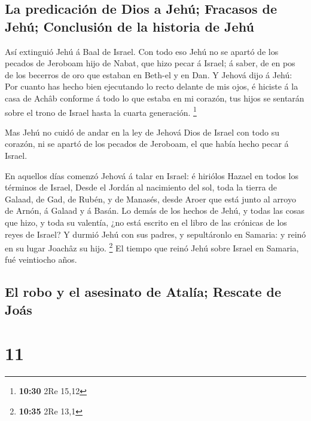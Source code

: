 \hypertarget{la-predicaciuxf3n-de-dios-a-jehuxfa-fracasos-de-jehuxfa-conclusiuxf3n-de-la-historia-de-jehuxfa}{%
\subsection{La predicación de Dios a Jehú; Fracasos de Jehú; Conclusión
de la historia de
Jehú}\label{la-predicaciuxf3n-de-dios-a-jehuxfa-fracasos-de-jehuxfa-conclusiuxf3n-de-la-historia-de-jehuxfa}}

 Así extinguió Jehú á Baal de Israel.  Con
todo eso Jehú no se apartó de los pecados de Jeroboam hijo de Nabat, que
hizo pecar á Israel; á saber, de en pos de los becerros de oro que
estaban en Beth-el y en Dan.  Y Jehová dijo á Jehú: Por
cuanto has hecho bien ejecutando lo recto delante de mis ojos, é hiciste
á la casa de Achâb conforme á todo lo que estaba en mi corazón, tus
hijos se sentarán sobre el trono de Israel hasta la cuarta generación.
\footnote{\textbf{10:30} 2Re 15,12}

 Mas Jehú no cuidó de andar en la ley de Jehová Dios de
Israel con todo su corazón, ni se apartó de los pecados de Jeroboam, el
que había hecho pecar á Israel.

 En aquellos días comenzó Jehová á talar en Israel: é
hiriólos Hazael en todos los términos de Israel,  Desde
el Jordán al nacimiento del sol, toda la tierra de Galaad, de Gad, de
Rubén, y de Manasés, desde Aroer que está junto al arroyo de Arnón, á
Galaad y á Basán.  Lo demás de los hechos de Jehú, y
todas las cosas que hizo, y toda su valentía, ¿no está escrito en el
libro de las crónicas de los reyes de Israel?  Y durmió
Jehú con sus padres, y sepultáronlo en Samaria: y reinó en su lugar
Joachâz su hijo. \footnote{\textbf{10:35} 2Re 13,1}  El
tiempo que reinó Jehú sobre Israel en Samaria, fué veintiocho años.

\hypertarget{el-robo-y-el-asesinato-de-ataluxeda-rescate-de-jouxe1s}{%
\subsection{El robo y el asesinato de Atalía; Rescate de
Joás}\label{el-robo-y-el-asesinato-de-ataluxeda-rescate-de-jouxe1s}}

\hypertarget{section-10}{%
\section{11}\label{section-10}}

